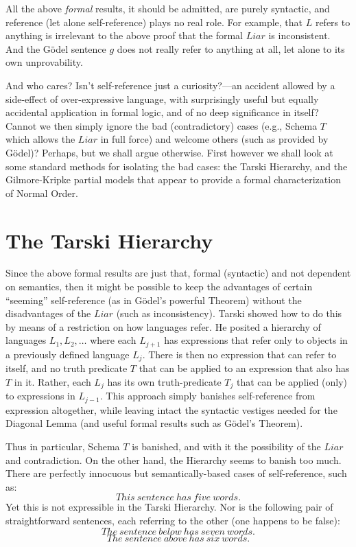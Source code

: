 \documentclass{amsart}
\begin{document}
All the above {\em formal} results, it should be admitted, are purely
syntactic, and reference (let alone self-reference) plays no real
role. For example, that $L$ refers to anything is irrelevant to the
above proof that the formal $Liar$ is inconsistent.  And the G\"odel
sentence $g$ does not really refer to anything at all, let alone to
its own unprovability.

And who cares? Isn't self-reference just a curiosity?---an accident
allowed by a side-effect of over-expressive language, with
surprisingly useful but equally accidental application in formal
logic, and of no deep significance in itself?  Cannot we then simply
ignore the bad (contradictory) cases (e.g., Schema $T$ which allows
the $Liar$ in full force) and welcome others (such as provided by
G\"odel)? Perhaps, but we shall argue otherwise.  First however we
shall look at some standard methods for isolating the bad cases: the
Tarski Hierarchy, and the Gilmore-Kripke partial models that appear to
provide a formal characterization of Normal Order.


\section{The Tarski Hierarchy}

Since the above formal results are just that, formal (syntactic) and
not dependent on semantics, then it might be possible to keep the
advantages of certain ``seeming'' self-reference (as in G\"{o}del's
powerful Theorem) without the disadvantages of the $Liar$ (such as
inconsistency). Tarski showed how to do this by means of a restriction
on how languages refer. He posited a hierarchy of languages $L_1, L_2,
\ldots$ where each $L_{j+1}$ has expressions that refer only to objects in
a previously defined language $L_{j}$.  There is then no expression
that can refer to itself, and no truth predicate $T$ that can be
applied to an expression that also has $T$ in it. Rather, each $L_j$
has its own truth-predicate $T_j$ that can be applied (only) to
expressions in $L_{j-1}$.  This approach simply banishes
self-reference from expression altogether, while leaving intact the
syntactic vestiges needed for the Diagonal Lemma (and useful formal
results such as G\"{o}del's Theorem).

Thus in particular, Schema $T$ is banished, and with it the
possibility of the $Liar$ and contradiction. On the other hand, the
Hierarchy seems to banish too much. There are perfectly innocuous but
semantically-based cases of self-reference, such as:
$$This~ sentence~ has~ five~ words.$$
\noindent
Yet this is not expressible in the Tarski Hierarchy.  Nor is the following pair
of straightforward sentences, each referring to the other (one happens
to be false):
$$The~ sentence~ below~ has~ seven~ words.$$
$$The~ sentence~ above~ has~ six~ words.$$
\end{document}
